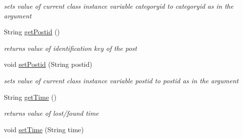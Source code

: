 \begin{DoxyCompactItemize}
\begin{DoxyCompactList}\small\item\em sets value of current class instance variable categoryid to categoryid as in the argument \end{DoxyCompactList}\item 
\hypertarget{classcom_1_1example_1_1sel_1_1lostfound_1_1UserPost_a02152ed8f7856d79945bb503fb0ad5ff}{\-String \hyperlink{classcom_1_1example_1_1sel_1_1lostfound_1_1UserPost_a02152ed8f7856d79945bb503fb0ad5ff}{get\-Postid} ()}\label{classcom_1_1example_1_1sel_1_1lostfound_1_1UserPost_a02152ed8f7856d79945bb503fb0ad5ff}

\begin{DoxyCompactList}\small\item\em returns value of identification key of the post \end{DoxyCompactList}\item 
\hypertarget{classcom_1_1example_1_1sel_1_1lostfound_1_1UserPost_aa5da2d50f9359ab1899b0b59bb3f2738}{void \hyperlink{classcom_1_1example_1_1sel_1_1lostfound_1_1UserPost_aa5da2d50f9359ab1899b0b59bb3f2738}{set\-Postid} (\-String postid)}\label{classcom_1_1example_1_1sel_1_1lostfound_1_1UserPost_aa5da2d50f9359ab1899b0b59bb3f2738}

\begin{DoxyCompactList}\small\item\em sets value of current class instance variable postid to postid as in the argument \end{DoxyCompactList}\item 
\hypertarget{classcom_1_1example_1_1sel_1_1lostfound_1_1UserPost_a9f0a4da541ebc349fca11bbd83757288}{\-String \hyperlink{classcom_1_1example_1_1sel_1_1lostfound_1_1UserPost_a9f0a4da541ebc349fca11bbd83757288}{get\-Time} ()}\label{classcom_1_1example_1_1sel_1_1lostfound_1_1UserPost_a9f0a4da541ebc349fca11bbd83757288}

\begin{DoxyCompactList}\small\item\em returns value of lost/found time \end{DoxyCompactList}\item 
\hypertarget{classcom_1_1example_1_1sel_1_1lostfound_1_1UserPost_ae6ad4007a7fc1bffaa505d2d70825668}{void \hyperlink{classcom_1_1example_1_1sel_1_1lostfound_1_1UserPost_ae6ad4007a7fc1bffaa505d2d70825668}{set\-Time} (\-String time)}\label{classcom_1_1example_1_1sel_1_1lostfound_1_1UserPost_ae6ad4007a7fc1bffaa505d2d70825668}


\end{DoxyCompactItemize}
